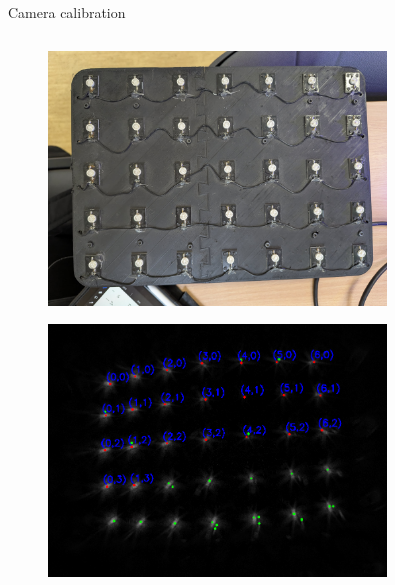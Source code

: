 \documentclass{beamer}
\begin{document}
\begin{frame}{Camera calibration}
   

\begin{columns}[T]
    \begin{column}{0.48\textwidth}
        \vspace{-0.1cm}
        \begin{figure}[H]
            \centering
            \includegraphics[width=0.8\textwidth]{../fig/photos/lattice.jpeg}
            \label{fig:lattice_img}
        \end{figure}
        
        \vspace{0.1cm}
        
        \begin{figure}[H]
            \centering
            \includegraphics[width=0.8\textwidth]{../fig/photos/lattice_blobs1.png}
            \label{fig:lattice_evs}
        \end{figure}
    \end{column}
    

\end{columns}
\end{frame}
\end{document}
